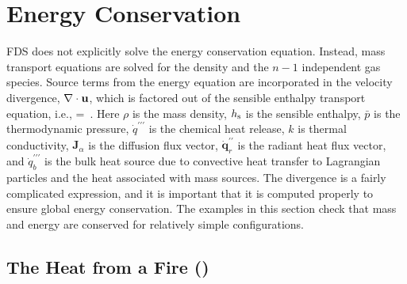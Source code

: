 \documentclass[11pt]{book}
\begin{document}
\section{Energy Conservation}

FDS does not explicitly solve the energy conservation equation. Instead, mass transport equations are solved for the density and the $n-1$ independent gas species. Source terms from the energy equation are incorporated in the velocity  divergence, $\nabla \cdot {\mathbf{u}}$, which is factored out of the sensible enthalpy transport equation, i.e.,
\be
\label{eqn_new_div}
\nabla\cdot{} =   \,\mbox{.}
\ee
Here $\rho$ is the mass density, $h_{\rm s}$ is the sensible enthalpy, $\bar{p}$ is the thermodynamic pressure, $\dot{q}^{\prime\prime\prime}$ is the chemical heat release, $k$ is thermal conductivity, $\mathbf{J}_\alpha$ is the diffusion flux vector, $\dot{\mathbf{q}}_r^{\prime\prime}$ is the radiant heat flux vector, and $\dot{q}_b^{\prime\prime\prime}$ is the bulk heat source due to convective heat transfer to Lagrangian particles and the heat associated with mass sources. The divergence is a fairly complicated expression, and it is important that it is computed properly to ensure global energy conservation. The examples in this section check that mass and energy are conserved for relatively simple configurations.

\subsection{The Heat from a Fire (\texorpdfstring{}{energy\_budget})}
\label{energy_budget_walls}
\label{energy_budget_adiabatic_walls}
\label{energy_budget_cold_walls}
\end{document}
